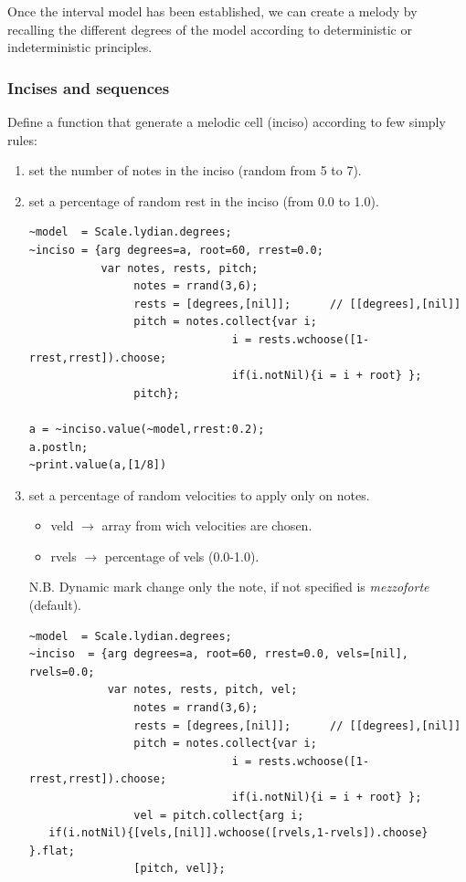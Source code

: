 Once the interval model has been established, we can create a melody by recalling the different degrees of the model according to deterministic or indeterministic principles.

\subsubsection{Incises and sequences}\label{incises-and-sequences}

Define a function that generate a melodic cell (inciso) according to few simply rules:

\begin{enumerate}
\def\labelenumi{\arabic{enumi}.}
\tightlist
\item set the number of notes in the inciso (random from 5 to 7).
\item set a percentage of random rest in the inciso (from 0.0 to 1.0).

\begin{lstlisting}[frame=single] 
~model  = Scale.lydian.degrees; 
~inciso = {arg degrees=a, root=60, rrest=0.0;
           var notes, rests, pitch;
                notes = rrand(3,6);
                rests = [degrees,[nil]];      // [[degrees],[nil]]
                pitch = notes.collect{var i; 
                               i = rests.wchoose([1-rrest,rrest]).choose;
                               if(i.notNil){i = i + root} };
                pitch};

a = ~inciso.value(~model,rrest:0.2);
a.postln;
~print.value(a,[1/8])
\end{lstlisting}

\item set a percentage of random velocities to apply only on notes.
  \begin{itemize}
  \tightlist
  \item veld \(\rightarrow\) array from wich velocities are chosen.
  \item rvels \(\rightarrow\) percentage of vels (0.0-1.0).
  \end{itemize}

  N.B. Dynamic mark change only the note, if not specified is \textit{mezzoforte} (default).

\begin{lstlisting}[frame=single] 
~model  = Scale.lydian.degrees; 
~inciso  = {arg degrees=a, root=60, rrest=0.0, vels=[nil], rvels=0.0;
            var notes, rests, pitch, vel;
                notes = rrand(3,6);
                rests = [degrees,[nil]];      // [[degrees],[nil]]
                pitch = notes.collect{var i; 
                               i = rests.wchoose([1-rrest,rrest]).choose;
                               if(i.notNil){i = i + root} };
                vel = pitch.collect{arg i;
   if(i.notNil){[vels,[nil]].wchoose([rvels,1-rvels]).choose} }.flat;
                [pitch, vel]};


\end{lstlisting}
\end{enumerate}
